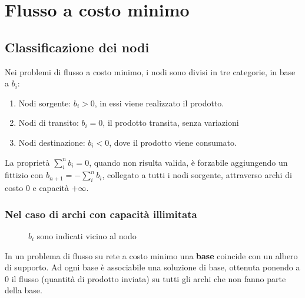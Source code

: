 \documentclass[../template]{subfiles}
\begin{document}
\section{Flusso a costo minimo}
\begin{center}
\end{center}
\subsection{Classificazione dei nodi}
Nei problemi di flusso a costo minimo, i nodi sono divisi in tre categorie, in base a $b_i$:
\begin{enumerate}
    \item Nodi sorgente: $b_i > 0$, in essi viene realizzato il prodotto.
    \item Nodi di transito: $b_i = 0$, il prodotto transita, senza variazioni
    \item Nodi destinazione: $b_i < 0$, dove il prodotto viene consumato.
\end{enumerate}
La proprietà $\sum_i^n b_i = 0$, quando non risulta valida, è forzabile aggiungendo un fittizio
con $b_{n+1} = -\sum_i^n b_i$, collegato a tutti i nodi sorgente, attraverso archi di costo 0 e capacità $+\infty$.

\subsubsection{Nel caso di archi con capacità illimitata}
\begin{wrapfigure}{R}{0pt}
    \centering
    \caption{$b_i$ sono indicati vicino al nodo}
    \label{graph:infty_flux}
\end{wrapfigure}
In un problema di flusso su rete a costo minimo una \textbf{base} coincide con un albero di supporto.
Ad ogni base è associabile una soluzione di base, ottenuta ponendo a 0 il flusso (quantità di
prodotto inviata) su tutti gli archi che non fanno parte della base.
\end{document}
